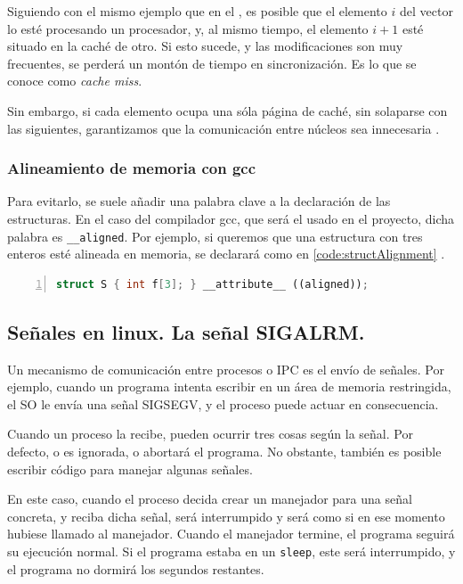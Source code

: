 Siguiendo con el mismo ejemplo que en el , es posible que el elemento $i$ del vector lo 
esté procesando un procesador, y, al mismo tiempo, el elemento $i+1$ esté situado en la caché de otro. Si esto sucede, 
y las modificaciones son muy frecuentes, se perderá un montón de tiempo en sincronización. Es lo que se conoce como 
\emph{cache miss}.

Sin embargo, si cada elemento ocupa una sóla página de caché, sin solaparse con las siguientes, garantizamos que la 
comunicación entre núcleos sea innecesaria \cite{intelAlignmentSMP}.

\subsubsection{Alineamiento de memoria con gcc}
Para evitarlo, se suele añadir una palabra clave a la declaración de las estructuras. En el caso del compilador gcc, 
que será el usado en el proyecto, dicha palabra es \texttt{\_\_aligned}. Por ejemplo, si queremos que una estructura 
con tres enteros esté alineada en memoria, se declarará como en \lstlistingname{}\ref{code:structAlignment} 
\cite{gccTypeAttributes}.

\begin{lstlisting}[language=C++,caption={Alineamiento de una estructura de datos}, 
breaklines=true, label=code:structAlignment,numbers=left,float=htbp]
 struct S { int f[3]; } __attribute__ ((aligned));
\end{lstlisting}

\subsection{Señales en linux. La señal SIGALRM.}
Un mecanismo de comunicación entre procesos o \gls{IPC} es el envío de señales. Por ejemplo, cuando un programa intenta 
escribir en un área de memoria restringida, el \gls{SO} le envía una señal \gls{SIGSEGV}, y el proceso puede actuar en 
consecuencia.

Cuando un proceso la recibe, pueden ocurrir tres cosas según la señal. Por defecto, o es ignorada, o abortará el 
programa. No obstante, también es posible escribir código para manejar algunas señales.

En este caso, cuando el proceso decida crear un manejador para una señal concreta, y 
reciba dicha señal, será interrumpido y será como si en ese momento hubiese llamado al manejador. Cuando el manejador 
termine, el programa seguirá su ejecución normal. Si el programa estaba en un \texttt{sleep}, este será interrumpido, y 
el programa no dormirá los segundos restantes.

